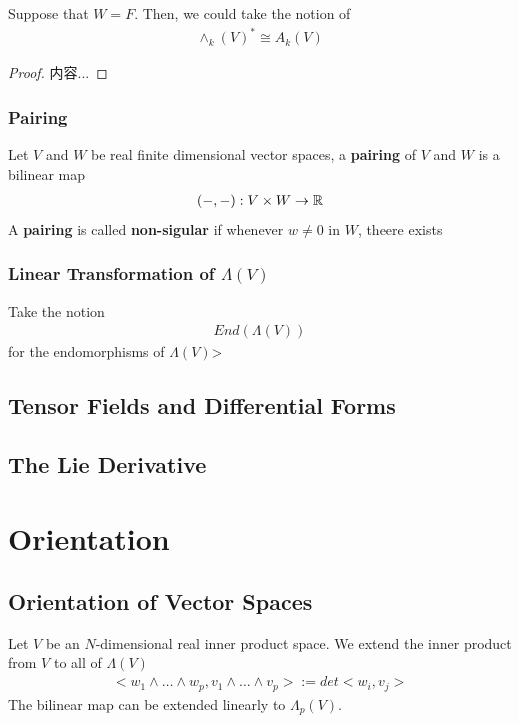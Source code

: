 \documentclass[Total.tex]{subfiles}
\begin{document}
						\begin{corollary}
							Suppose that $W=F$. Then, we could take the notion of
							\begin{gather*}
								\wedge_k(V)^*\cong A_k(V)
							\end{gather*}
						\end{corollary}
						\begin{proof}
							内容...
						\end{proof}
					\subsubsection{Pairing}
						\begin{Def}
							Let $V$ and $W$ be real finite dimensional vector spaces, a \textbf{pairing} of $V$ and $W$ is a bilinear map
							\begin{gather*}
								(-,-):V\times W\rightarrow \mathbb{R}
							\end{gather*}
							A \textbf{pairing} is called \textbf{non-sigular} if whenever $w\not=0$ in $W$, theere exists 
						\end{Def}
					\subsubsection{Linear Transformation of $\Lambda(V)$}
						Take the notion
						\begin{gather*}
							End(\Lambda(V))
						\end{gather*}
						for the endomorphisms of $\Lambda(V)$>
			\subsection{Tensor Fields and Differential Forms}
			\subsection{The Lie Derivative}
		\section{Orientation}
			\subsection{Orientation of Vector Spaces}
				\begin{Def}
					Let $V$ be an $N$-dimensional real inner product space. We extend the inner product from $V$ to all of $\Lambda(V)$
					\begin{gather*}
						<w_1\wedge \dots\wedge w_p,v_1\wedge\dots\wedge v_p>:=det<w_i,v_j>
					\end{gather*}
					The bilinear map can be extended linearly to $\Lambda_p(V)$.
				\end{Def}
				
\end{document}
